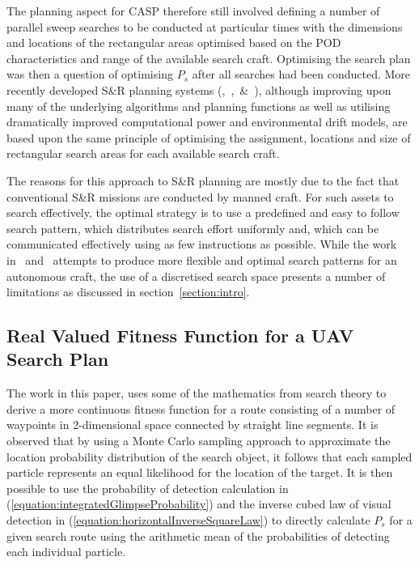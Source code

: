 \documentclass[10pt,a4paper, oneside, conference]{IEEEtran}
\begin{document}
	The planning aspect for CASP therefore still involved defining a number of parallel sweep searches to be conducted at particular times with the dimensions and locations of the rectangular areas optimised based on the POD characteristics and range of the available search craft.
	Optimising the search plan was then a question of optimising $P_s$ after all searches had been conducted.
	More recently developed S\&R planning systems (\cite{Liao2010},~\cite{ODonnell2006},~\cite{BREIVIK200899}\&~\cite{ABIZEID2005630}), although improving upon many of the underlying algorithms and planning functions as well as utilising dramatically improved computational power and environmental drift models, are based upon the same principle of optimising the assignment, locations and size of rectangular search areas for each available search craft.
	
	The reasons for this approach to S\&R planning are mostly due to the fact that conventional S\&R missions are conducted by manned craft.
	For such assets to search effectively, the optimal strategy is to use a predefined and easy to follow search pattern, which distributes search effort uniformly and, which can be communicated effectively using as few instructions as possible. 
	While the work in~\cite{Lin2009} and~\cite{Lin2014} attempts to produce more flexible and optimal search patterns for an autonomous craft, the use of a discretised search space presents a number of limitations as discussed in section~\ref{section:intro}.
	
	\subsection{Real Valued Fitness Function for a UAV Search Plan}
	
	The work in this paper, uses some of the mathematics from search theory to derive a more continuous fitness function for a route consisting of a number of waypoints in 2-dimensional space connected by straight line segments.
	It is observed that by using a Monte Carlo sampling approach to approximate the location probability distribution of the search object, it follows that each sampled particle represents an equal likelihood for the location of the target. 
	It is then possible to use the probability of detection calculation in (\ref{equation:integratedGlimpseProbability}) and the inverse cubed law of visual detection in (\ref{equation:horizontalInverseSquareLaw}) to directly calculate $P_s$ for a given search route using the arithmetic mean of the probabilities of detecting each individual particle.
	
\end{document}
